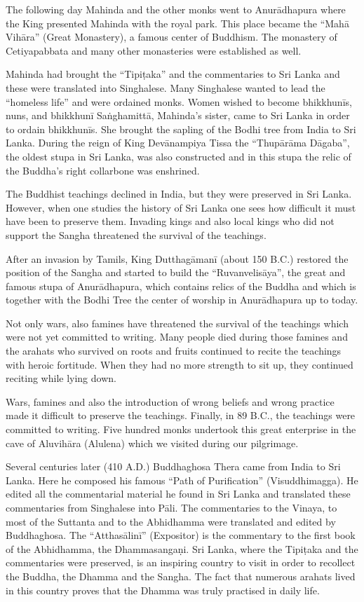 The following day Mahinda and the other monks went to Anurādhapura where
the King presented Mahinda with the royal park. This place became the
``Mahā Vihāra'' (Great Monastery), a famous center of Buddhism. The
monastery of Cetiyapabbata and many other monasteries were established
as well.

Mahinda had brought the ``Tipiṭaka'' and the commentaries to Sri Lanka
and these were translated into Singhalese. Many Singhalese wanted to
lead the ``homeless life'' and were ordained monks. Women wished to
become bhikkhunīs, nuns, and bhikkhunī Saṅghamittā, Mahinda's sister,
came to Sri Lanka in order to ordain bhikkhunīs. She brought the sapling
of the Bodhi tree from India to Sri Lanka. During the reign of King
Devānampiya Tissa the ``Thupārāma Dāgaba'', the oldest stupa in Sri
Lanka, was also constructed and in this stupa the relic of the Buddha's
right collarbone was enshrined.

The Buddhist teachings declined in India, but they were preserved in Sri
Lanka. However, when one studies the history of Sri Lanka one sees how
difficult it must have been to preserve them. Invading kings and also
local kings who did not support the Sangha threatened the survival of
the teachings.

After an invasion by Tamils, King Dutthagāmanī (about 150 B.C.) restored
the position of the Sangha and started to build the ``Ruvanvelisāya'',
the great and famous stupa of Anurādhapura, which contains relics of the
Buddha and which is together with the Bodhi Tree the center of worship
in Anurādhapura up to today.

Not only wars, also famines have threatened the survival of the
teachings which were not yet committed to writing. Many people died
during those famines and the arahats who survived on roots and fruits
continued to recite the teachings with heroic fortitude. When they had
no more strength to sit up, they continued reciting while lying down.

Wars, famines and also the introduction of wrong beliefs and wrong
practice made it difficult to preserve the teachings. Finally, in 89
B.C., the teachings were committed to writing. Five hundred monks
undertook this great enterprise in the cave of Aluvihāra (Alulena) which
we visited during our pilgrimage.

Several centuries later (410 A.D.) Buddhaghosa Thera came from India to
Sri Lanka. Here he composed his famous ``Path of Purification''
(Visuddhimagga). He edited all the commentarial material he found in Sri
Lanka and translated these commentaries from Singhalese into Pāli. The
commentaries to the Vinaya, to most of the Suttanta and to the
Abhidhamma were translated and edited by Buddhaghosa. The
``Atthasālinī'' (Expositor) is the commentary to the first book of the
Abhidhamma, the Dhammasangaṇi. Sri Lanka, where the Tipiṭaka and the
commentaries were preserved, is an inspiring country to visit in order
to recollect the Buddha, the Dhamma and the Sangha. The fact that
numerous arahats lived in this country proves that the Dhamma was truly
practised in daily life.


